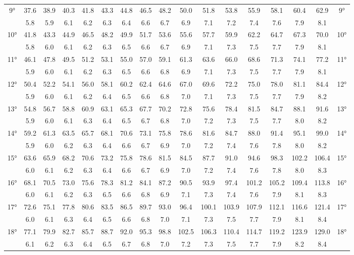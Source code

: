 \begin{scriptsize}
\begin{tabular}{c || c | c | c | c | c | c | c | c | c | c | c | c | c | c | c || c}
		\multirow{2}{*}{9°}&37.6&38.9&40.3&41.8&43.3&44.8&46.5&48.2&50.0&51.8&53.8&55.9&58.1&60.4&62.9&\multirow{2}{*}{9°}\\ \space&5.8&5.9&6.1&6.2&6.3&6.4&6.6&6.7&6.9&7.1&7.2&7.4&7.6&7.9&8.1&\space\\\hline
		\multirow{2}{*}{10°}&41.8&43.3&44.9&46.5&48.2&49.9&51.7&53.6&55.6&57.7&59.9&62.2&64.7&67.3&70.0&\multirow{2}{*}{10°}\\ \space&5.8&6.0&6.1&6.2&6.3&6.5&6.6&6.7&6.9&7.1&7.3&7.5&7.7&7.9&8.1&\space\\\hline
		\multirow{2}{*}{11°}&46.1&47.8&49.5&51.2&53.1&55.0&57.0&59.1&61.3&63.6&66.0&68.6&71.3&74.1&77.2&\multirow{2}{*}{11°}\\ \space&5.9&6.0&6.1&6.2&6.3&6.5&6.6&6.8&6.9&7.1&7.3&7.5&7.7&7.9&8.1&\space\\\hline
		\multirow{2}{*}{12°}&50.4&52.2&54.1&56.0&58.1&60.2&62.4&64.6&67.0&69.6&72.2&75.0&78.0&81.1&84.4&\multirow{2}{*}{12°}\\ \space&5.9&6.0&6.1&6.2&6.4&6.5&6.6&6.8&7.0&7.1&7.3&7.5&7.7&7.9&8.2&\space\\\hline
		\multirow{2}{*}{13°}&54.8&56.7&58.8&60.9&63.1&65.3&67.7&70.2&72.8&75.6&78.4&81.5&84.7&88.1&91.6&\multirow{2}{*}{13°}\\ \space&5.9&6.0&6.1&6.3&6.4&6.5&6.7&6.8&7.0&7.2&7.3&7.5&7.7&8.0&8.2&\space\\\hline
		\multirow{2}{*}{14°}&59.2&61.3&63.5&65.7&68.1&70.6&73.1&75.8&78.6&81.6&84.7&88.0&91.4&95.1&99.0&\multirow{2}{*}{14°}\\ \space&5.9&6.0&6.2&6.3&6.4&6.6&6.7&6.9&7.0&7.2&7.4&7.6&7.8&8.0&8.2&\space\\\hline
		\multirow{2}{*}{15°}&63.6&65.9&68.2&70.6&73.2&75.8&78.6&81.5&84.5&87.7&91.0&94.6&98.3&102.2&106.4&\multirow{2}{*}{15°}\\ \space&6.0&6.1&6.2&6.3&6.4&6.6&6.7&6.9&7.0&7.2&7.4&7.6&7.8&8.0&8.3&\space\\\hline
		\multirow{2}{*}{16°}&68.1&70.5&73.0&75.6&78.3&81.2&84.1&87.2&90.5&93.9&97.4&101.2&105.2&109.4&113.8&\multirow{2}{*}{16°}\\ \space&6.0&6.1&6.2&6.3&6.5&6.6&6.8&6.9&7.1&7.3&7.4&7.6&7.9&8.1&8.3&\space\\\hline
		\multirow{2}{*}{17°}&72.6&75.1&77.8&80.6&83.5&86.5&89.7&93.0&96.4&100.1&103.9&107.9&112.1&116.6&121.4&\multirow{2}{*}{17°}\\ \space&6.0&6.1&6.3&6.4&6.5&6.6&6.8&7.0&7.1&7.3&7.5&7.7&7.9&8.1&8.4&\space\\\hline
		\multirow{2}{*}{18°}&77.1&79.9&82.7&85.7&88.7&92.0&95.3&98.8&102.5&106.3&110.4&114.7&119.2&123.9&129.0&\multirow{2}{*}{18°}\\ \space&6.1&6.2&6.3&6.4&6.5&6.7&6.8&7.0&7.2&7.3&7.5&7.7&7.9&8.2&8.4&\space\\\hline

\end{tabular}
\end{scriptsize}
